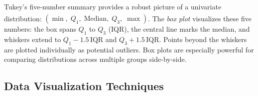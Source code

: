 \begin{tcbitemize}[ skin=sectionraster ]
    \tcbitem[title={Five-Number Summary \& Box Plot}, raster multicolumn=6]
    Tukey's five-number summary provides a robust picture of a univariate distribution\textsuperscript{\cite{brucePracticalStatisticsData2017}}:
    $(\min,\; Q_1,\; \text{Median},\; Q_3,\; \max)$.
    The \emph{box plot} visualizes these five numbers: the box spans $Q_1$ to $Q_3$ (IQR), the central line marks the median, and whiskers extend to $Q_1 - 1.5\,\text{IQR}$ and $Q_3 + 1.5\,\text{IQR}$.
    Points beyond the whiskers are plotted individually as potential outliers.
    Box plots are especially powerful for comparing distributions across multiple groups side-by-side.
    \tcblower
    \begin{center}
    \end{center}
\end{tcbitemize}

\subsection{Data Visualization Techniques}

